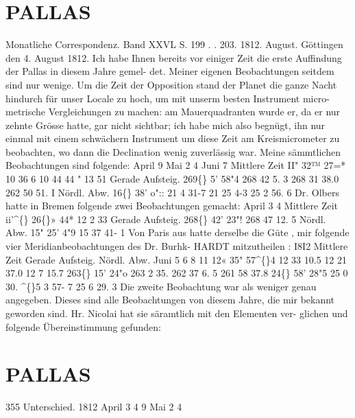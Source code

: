\documentclass[12pt,a4paper]{article}
\newcommand{\degree}{\textdegree}
\begin{document}
\section*{PALLAS}
Monatliche  Correspondenz.     Band  XXVL  S.  199  .  .  203.     1812.  August. 
Göttingen  den  4.  August  1812. 
Ich  habe  Ihnen  bereits  vor  einiger  Zeit  die  erste  Auffindung  der  Pallas  in  diesem  Jahre  gemel- 
det. Meiner  eigenen  Beobachtungen  seitdem  sind  nur  wenige.  Um  die  Zeit  der  Opposition  stand  der 
Planet  die  ganze  Nacht  hindurch  für  unser  Locale  zu  hoch,  um  mit  unserm  besten  Instrument  micro- 
metrische Vergleichungen  zu  machen:  am  Mauerquadranten  wurde  er,  da  er  nur  zehnte  Grösse  hatte, 
gar  nicht  sichtbar;  ich  habe  mich  also  begnügt,  ihn  nur  einmal  mit  einem  schwächern  Instrument  um 
diese  Zeit  am  Kreismicrometer  zu  beobachten,  wo  dann  die  Declination  wenig  zuverlässig  war. 
Meine  sämmtlichen  Beobachtungen  sind  folgende: 
April   9 
Mai     2 
4 
Juni     7 
Mittlere  Zeit 
II"  32™  27=* 
10  36  6 
10  44  44 
"     13     51 
Gerade  Aufsteig. 
269\degree\{\}     5'  58"4 
268     42  5. 3 
268     31  38.0 
262     50  51. I 
Nördl.  Abw. 
16\degree\{\}  38'  o":: 
21      4  31-7 
21     25  4-3 
25       2  56. 6 
Dr.  Olbers  hatte  in  Bremen  folgende  zwei  Beobachtungen  gemacht: 
April  3 
4 
Mittlere  Zeit 
ii'\textasciicircum\{\}  26\degree\{\}»  44* 
12      2    33 
Gerade  Aufsteig. 
268\degree\{\}  42'   23"! 
268     47     12. 5 
Nördl.  Abw. 
15"  25'     4"9 
15     37     41- 1 
Von  Paris  aus  hatte  derselbe  die  Güte ,  mir  folgende  vier  Meridianbeobachtungen  des  Dr.  Burhk- 
HARDT  mitzutheilen : 
I8I2 
Mittlere  Zeit 
Gerade  Aufsteig. 
Nördl.  Abw. 
Juni    5 
6 
8 
11 
12«  35"  57\textasciicircum\{\}4 
12     33     10.5 
12       21       37.0 
12          7       15.7 
263\degree\{\}  15'    24"o 
263      2     35. 
262     37       6. 5 
261     58     37.8 
24\degree\{\}  58'    28"5 
25       0     30. 
\textasciicircum\{\}5       3     57-  7 
25       6     29. 3 
Die  zweite  Beobachtung  war  als  weniger  genau  angegeben.  Dieses  sind  alle  Beobachtungen  von 
diesem  Jahre,  die  mir  bekannt  geworden  sind.  Hr.  Nicolai  hat  sie  säramtlich  mit  den  Elementen  ver- 
glichen und  folgende  Übereinstimmung  gefunden: 


\newpage

\section*{PALLAS}
355 
Unterschied. 
1812 
April  3 
4 
9 
Mai     2 
4 
\end{document}
